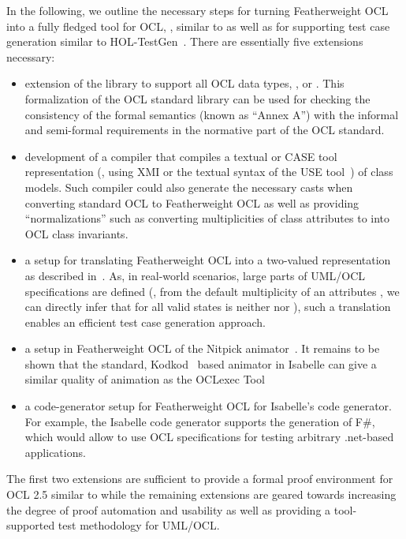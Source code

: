 In the following, we outline the necessary steps for turning
Featherweight OCL into a fully fledged tool for OCL, \eg, similar to
\holocl as well as for supporting test case generation similar to
{HOL}-TestGen~\cite{brucker.ea:hol-testgen:2009}.  There are
essentially five extensions necessary:
\begin{itemize}
\item extension of the library to support all OCL data types, \eg,
   or .  This
  formalization of the OCL standard library can be used for checking
  the consistency of the formal semantics (known as ``Annex A'') with
  the informal and semi-formal requirements in the normative part of
  the OCL standard.
\item development of a compiler that compiles a textual or CASE
  tool representation (\eg, using XMI or the textual syntax of
  the USE tool~\cite{richters:precise:2002}) of class
  models. Such compiler could also generate the necessary casts when
  converting standard OCL to Featherweight OCL as well as providing
  ``normalizations'' such as converting multiplicities of class
  attributes to into OCL class invariants.
\item a setup for translating Featherweight OCL into a two-valued
  representation as described
  in~\cite{brucker.ea:ocl-testing:2010}. As, in real-world scenarios,
  large parts of {UML}/{OCL} specifications are defined (\eg,
  from the default multiplicity  of an attributes
  , we can directly infer that for all valid states
   is neither  nor ),
  such a translation enables an efficient test case generation
  approach.
\item a setup in Featherweight OCL of the Nitpick
  animator~\cite{blanchette.ea:nitpick:2010}. It remains to be shown
  that the standard, Kodkod~\cite{torlak.ea:kodkod:2007} based
  animator in Isabelle can give a similar quality of animation as the
  OCLexec Tool~\cite{krieger.ea:generative:2010}
\item a code-generator setup for Featherweight OCL for Isabelle's
  code generator. For example, the Isabelle code generator supports
  the generation of F\#, which would allow to use {OCL}
  specifications for testing arbitrary .net-based applications.
\end{itemize}
The first two extensions are sufficient to provide a formal proof
environment for OCL 2.5 similar to \holocl while the remaining
extensions are geared towards increasing the degree of proof
automation and usability as well as providing a tool-supported test
methodology for {UML}/{OCL}.


